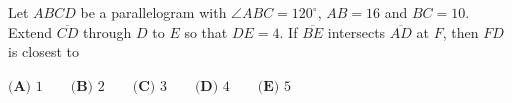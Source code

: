 Let $ABCD$ be a parallelogram with $\angle ABC=120^\circ$, $AB=16$ and $BC=10$. Extend $\overline{CD}$ through $D$ to $E$ so that $DE=4$. If $\overline{BE}$ intersects $\overline{AD}$ at $F$, then $FD$ is closest to

$\textbf{(A) }1\qquad\textbf{(B) }2\qquad\textbf{(C) }3\qquad\textbf{(D) }4\qquad\textbf{(E) }5$

